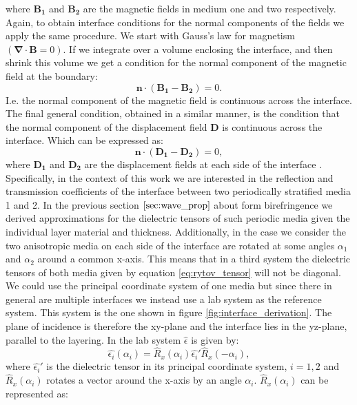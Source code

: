 where $\bm{B_1}$ and $\bm{B_2}$ are the magnetic fields in medium one and two respectively.
Again, to obtain interface conditions for the normal components of the fields we apply the same procedure. We start with Gauss's law for magnetism $(\bm{\nabla}\cdot \bm{B} = 0)$. If we integrate over a volume enclosing the interface, and then shrink this volume we get a condition for the normal component of the magnetic field at the boundary:
\begin{equation}
    \label{eq:n_boundary_cond_b}
    \bm{n}\cdot(\bm{B_1}-\bm{B_2}) = 0.
\end{equation}
I.e. the normal component of the magnetic field is continuous across the interface. The final general condition, obtained in a similar manner, is the condition that the normal component of the displacement field $\bm{D}$ is continuous across the interface. Which can be expressed as:
\begin{equation}
    \label{eq:n_boundary_cond_d}
    \bm{n}\cdot(\bm{D_1}-\bm{D_2}) = 0,
\end{equation}
where $\bm{D_1}$ and $\bm{D_2}$ are the displacement fields at each side of the interface \cite{Destriau1949, Griffiths2017}. Specifically, in the context of this work we are interested in the reflection and transmission coefficients of the interface between two periodically stratified media 1 and 2. In the previous section $\ref{sec:wave_prop}$ about form birefringence we derived approximations for the dielectric tensors of such periodic media given the individual layer material and thickness. Additionally, in the case we consider the two anisotropic media on each side of the interface are rotated at some angles $\alpha_1$ and $\alpha_2$ around a common x-axis. This means that in a third system the dielectric tensors of both media given by equation \ref{eq:rytov_tensor} will not be diagonal. We could use the principal coordinate system of one media but since there in general are multiple interfaces we instead use a lab system as the reference system. This system is the one shown in figure \ref{fig:interface_derivation}. The plane of incidence is therefore the xy-plane and the interface lies in the yz-plane, parallel to the layering. In the lab system $\hat{\epsilon}$ is given by:
\begin{equation}
    \label{eq:lab_epsilon}
    \hat{\epsilon_i}(\alpha_i) = \hat{R}_x(\alpha_i) \hat{\epsilon_i}' \hat{R}_x(-\alpha_i),
\end{equation}
where $\hat{\epsilon_i}'$ is the dielectric tensor in its principal coordinate system, $i=1,2$ and $\hat{R}_x(\alpha_i)$ rotates a vector around the x-axis by an angle $\alpha_i$. $\hat{R}_x(\alpha_i)$ can be represented as:
